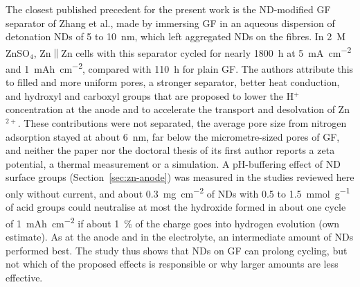 The closest published precedent for the present work is the ND-modified GF separator of Zhang et al.\cite{zhang_modulating_2024}, made by immersing GF in an aqueous dispersion of detonation NDs of 5 to \SI{10}{nm}, which left aggregated NDs on the fibres.
In \SI{2}{M} ZnSO$_4$, Zn$\|$Zn cells with this separator cycled for nearly \SI{1800}{h} at \SI{5}{mA.cm^{-2}} and \SI{1}{mAh.cm^{-2}}, compared with \SI{110}{h} for plain GF.
The authors attribute this to filled and more uniform pores, a stronger separator, better heat conduction, and hydroxyl and carboxyl groups that are proposed to lower the H$^+$ concentration at the anode and to accelerate the transport and desolvation of Zn$^{2+}$.
These contributions were not separated, the average pore size from nitrogen adsorption stayed at about \SI{6}{nm}, far below the micrometre-sized pores of GF\cite{hansen_role_2023}, and neither the paper nor the doctoral thesis of its first author reports a zeta potential, a thermal measurement or a simulation\cite{zhang_qiuxia_2025}.
A pH-buffering effect of ND surface groups (Section~\ref{sec:zn-anode}) was measured in the studies reviewed here only without current\cite{ding_bioinspired_2025,zhu_nanodiamond_2026}, and about \SI{0.3}{mg.cm^{-2}} of NDs\cite{zhang_modulating_2024} with 0.5 to \SI{1.5}{mmol.g^{-1}} of acid groups\cite{kulakova_surface_2004} could neutralise at most the hydroxide formed in about one cycle of \SI{1}{mAh.cm^{-2}} if about \SI{1}{\percent} of the charge goes into hydrogen evolution\cite{rana_electroanalytical_2025} (own estimate).
As at the anode\cite{wang_nanodiamond_2024,liu_multifunctional_2024} and in the electrolyte\cite{zhu_nanodiamond_2026}, an intermediate amount of NDs performed best\cite{zhang_modulating_2024}.
The study thus shows that NDs on GF can prolong cycling, but not which of the proposed effects is responsible or why larger amounts are less effective.

